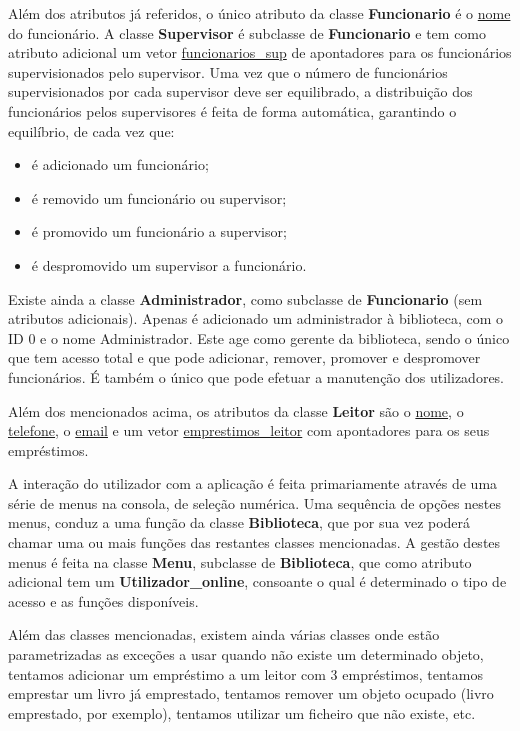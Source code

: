 \documentclass[12pt,a4paper,reqno]{report}
\numberwithin{figure}{section}
\numberwithin{equation}{section}
\begin{document}
Além dos atributos já referidos, o único atributo da classe \textbf{Funcionario} é o \underline{nome} do funcionário. A classe \textbf{Supervisor} é subclasse de \textbf{Funcionario} e tem como atributo adicional um vetor \underline{funcionarios\_sup} de apontadores para os funcionários supervisionados pelo supervisor. Uma vez que o número de funcionários supervisionados por cada supervisor deve ser equilibrado, a distribuição dos funcionários pelos supervisores é feita de forma automática, garantindo o equilíbrio, de cada vez que:
\begin{itemize}
	\item é adicionado um funcionário;
	\item é removido um funcionário ou supervisor;
	\item é promovido um funcionário a supervisor;
	\item é despromovido um supervisor a funcionário.
\end{itemize}

Existe ainda a classe \textbf{Administrador}, como subclasse de \textbf{Funcionario} (sem atributos adicionais). Apenas é adicionado um administrador à biblioteca, com o ID 0 e o nome Administrador. Este age como gerente da biblioteca, sendo o único que tem acesso total e que pode adicionar, remover, promover e despromover funcionários. É também o único que pode efetuar a manutenção dos utilizadores.

Além dos mencionados acima, os atributos da classe \textbf{Leitor} são o \underline{nome}, o \underline{telefone}, o \underline{email} e um vetor \underline{emprestimos\_leitor} com apontadores para os seus empréstimos.

A interação do utilizador com a aplicação é feita primariamente através de uma série de menus na consola, de seleção numérica. Uma sequência de opções nestes menus, conduz a uma função da classe \textbf{Biblioteca}, que por sua vez poderá chamar uma ou mais funções das restantes classes mencionadas. A gestão destes menus é feita na classe \textbf{Menu}, subclasse de \textbf{Biblioteca}, que como atributo adicional tem um \textbf{Utilizador\_online}, consoante o qual é determinado o tipo de acesso e as funções disponíveis.

Além das classes mencionadas, existem ainda várias classes onde estão parametrizadas as exceções a usar quando não existe um determinado objeto, tentamos adicionar um empréstimo a um leitor com 3 empréstimos, tentamos emprestar um livro já emprestado, tentamos remover um objeto ocupado (livro emprestado, por exemplo), tentamos utilizar um ficheiro que não existe, etc.
\end{document}
